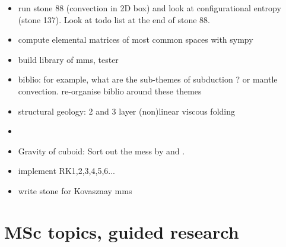 \documentclass[a4paper]{article}
\begin{document}
\begin{itemize}
\item run stone 88 (convection in 2D box) and look at configurational entropy 
(stone 137). Look at todo list at the end of stone 88.
\item compute elemental matrices of most common spaces with sympy
\item build library of mms, tester
\item biblio: for example, what are the sub-themes of subduction ? 
or mantle convection. re-organise biblio around these themes
\item structural geology: 2 and 3 layer (non)linear viscous folding
\item {}
\item Gravity of cuboid: Sort out the mess by \textcite{duti16} and \textcite{zhhu17}.
\item implement RK1,2,3,4,5,6...
\item write stone for Kovasznay mms
\end{itemize}

\newpage
\section{MSc topics, guided research}
\end{document}
